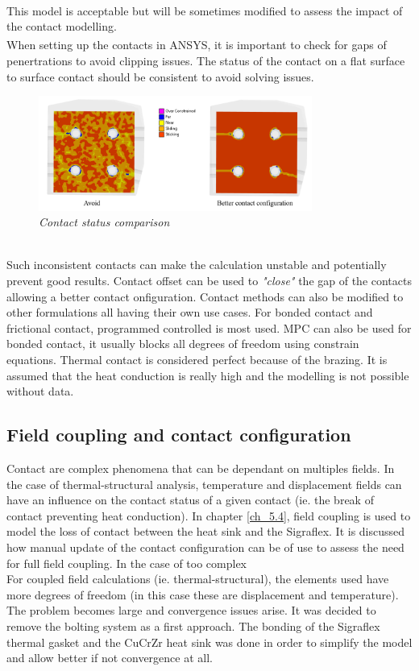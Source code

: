 \\
\break
\normalsize{This model is acceptable but will be sometimes modified to assess the impact of the contact modelling.}
\\
\break
\normalsize{\indent When setting up the contacts in ANSYS\textsuperscript{\textregistered}, it is important to check for gaps of penertrations to avoid clipping issues. The status of the contact on a flat surface to surface contact should be consistent to avoid solving issues.}
\begin{figure}[h!]
  \label{fig_4_1_0} 
  \centering
  \includegraphics[width=0.8\textwidth]{figures/wonrgvsrightcs.png}
  \caption{\it Contact status comparison}
\end{figure}
\\
\break
\normalsize{\indent Such inconsistent contacts can make the calculation unstable and potentially prevent good results. Contact offset can be used to {\it"close"} the gap of the contacts allowing a better contact onfiguration. Contact methods can also be modified to other formulations all having their own use cases. For bonded contact and frictional contact, programmed controlled is most used. MPC can also be used for bonded contact, it usually blocks all degrees of freedom using constrain equations. Thermal contact is considered perfect because of the brazing. It is assumed that the heat conduction is really high and the modelling is not possible without data.}
\subsection{Field coupling and contact configuration}
\normalsize{Contact are complex phenomena that can be dependant on multiples fields. In the case of thermal-structural analysis, temperature and displacement fields can have an influence on the contact status of a given contact (ie. the break of contact preventing heat conduction). In chapter \ref{ch_5.4}, field coupling is used to model the loss of contact between the heat sink and the Sigraflex. It is discussed how manual update of the contact configuration can be of use to assess the need for full field coupling. In the case of too complex }
\\
\break
\normalsize{\indent For coupled field calculations (ie. thermal-structural), the elements used have more degrees of freedom (in this case these are displacement and temperature). The problem becomes large and convergence issues arise. It was decided to remove the bolting system as a first approach. The bonding of the \acrshort{Sigraflex} thermal gasket and the \acrshort{CuCrZr} heat sink was done in order to simplify the model and allow better if not convergence at all.}
\newpage